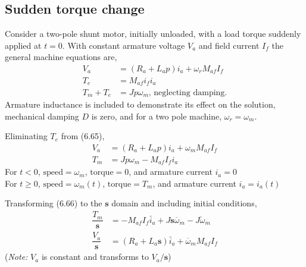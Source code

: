 \documentclass[a4paper,numbers=noenddot,12pt]{scrbook}
\begin{document}
    \subsection{Sudden torque change}
    Consider a two-pole shunt motor, initially unloaded, with a load torque suddenly applied at $t = 0$.
    With constant armature voltage $V_a$ and field current $I_f$ the general machine equations are,
    \begin{align}
        V_a & = (R_a + L_a p)i_a + \omega_r M_{af} I_f \nonumber \\
        T_e & = M_{af} i_f i_a \nonumber \\
        T_m + T_e & = J p \omega_m \text{, neglecting damping.}
        \label{eq:Eq6.65}
    \end{align}
    Armature inductance is included to demonstrate its effect on the solution, mechanical damping $D$ is zero, and for a two pole machine, $\omega_r = \omega_m$.

    Eliminating $T_e$ from (6.65),
    \begin{align}
        V_a & = (R_a + L_a p)i_a + \omega_m M_{af} I_f \nonumber \\
        T_m & = Jp\omega_m - M_{af} I_f i_a
        \label{eq:Eq.6.66}
    \end{align}
    For $t < 0$, $\text{speed}=\omega_m$, $\text{torque} = 0$, and armature current $i_a = 0$\\
    For $t \ge 0$, $\text{speed}=\omega_m(t)$, $\text{torque} = T_m$, and armature current $i_a = i_a (t)$

    Transforming (6.66) to the $\textbf{s}$ domain and including initial conditions,
    \begin{equation}
        \begin{aligned}
            \dfrac{T_m}{\mathbf{s}} & = - M_{af} I_f \bar i_a + J\mathbf{s} \overline \omega_m - J \mathring \omega_m \\ %
            \dfrac{V_a}{\mathbf{s}} & = (R_a + L_a\mathbf{s})\bar i_a + \overline \omega_m M_{af} I_f %
        \end{aligned}
        \label{eq:Eq.6.67}
    \end{equation}
    (\textit{Note:} $V_a$ is constant and transforms to $V_a/\mathbf{s}$)
\end{document}
